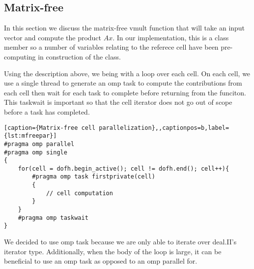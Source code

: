 \documentclass[12pt]{article}
\begin{document}
\subsection{Matrix-free}
In this section we discuss the matrix-free vmult function that will take an input vector and compute the product $Ax$. In our implementation, this is a class member so a number of variables relating to the referece cell have been pre-computing in construction of the class.

Using the description above, we being with a loop over each cell. On each cell, we use a single thread to generate an omp task to compute the contributions from each cell then wait for each task to complete before returning from the funciton. This taskwait is important so that the cell iterator does not go out of scope before a task has completed. 
\begin{lstlisting}[caption={Matrix-free cell parallelization},,captionpos=b,label={lst:mfreepar}]
#pragma omp parallel
#pragma omp single
{
  	for(cell = dofh.begin_active(); cell != dofh.end(); cell++){
		#pragma omp task firstprivate(cell)
		{
			// cell computation
		}
	}
	#pragma omp taskwait
}            
\end{lstlisting}

We decided to use omp task because we are only able to iterate over deal.II's iterator type. Additionally, when the body of the loop is large, it can be beneficial to use an omp task as opposed to an omp parallel for. 
\end{document}
